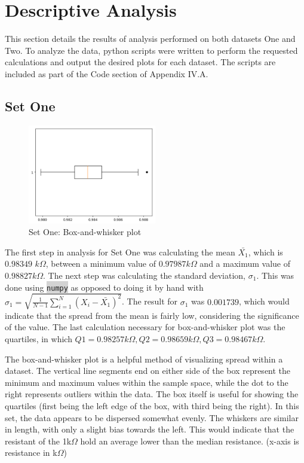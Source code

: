 \documentclass[10pt]{report}
\newcommand{\inlinecode}[2]{\colorbox{lightgray}{\lstinline[language=#1]$#2$}}
\begin{document}
\newpage

\section*{Descriptive Analysis}

This section details the results of analysis performed on both datasets One and Two.
To analyze the data, python scripts were written to perform the requested calculations and output the desired
plots for each dataset. The scripts are included as part of the Code section of Appendix IV.A.

\subsection*{Set One}

\begin{figure}
    \centering
    \includegraphics[width=0.50\textwidth]{results/resistor_boxplot}
    \caption{Set One: Box-and-whisker plot}
\end{figure}

The first step in analysis for Set One was calculating the mean $\bar{X_1}$, which is  $0.98349$ $k\Omega$,
between a minimum value of $0.97987 k\Omega$ and a maximum value of $0.98827 k\Omega$. The next step was calculating
the standard deviation, $\sigma_1$. This was done using \inlinecode{Python}{numpy} as opposed
to doing it by hand with $\sigma_1 = \sqrt{\frac{1}{N-1} \sum_{i=1}^N (X_i - \bar{X_1})^2}$.
The result for $\sigma_1$ was $0.001739$, which would indicate that the spread from the mean is fairly low,
considering the significance of the value.
The last calculation necessary for box-and-whisker plot was the quartiles,
in which $Q1 = 0.98257 k\Omega, Q2 = 0.98659 k\Omega, Q3 = 0.98467 k\Omega$.


The box-and-whisker plot is a helpful method of visualizing spread within a dataset.
The vertical line segments end on either side of the box represent the minimum and maximum
values within the sample space, while the dot to the right represents outliers within the data.
The box itself is useful for showing the quartiles (first being the left edge of the box, with
third being the right).
In this set, the data appears to be dispersed somewhat evenly. The whiskers are similar in length,
with only a slight bias towards the left. This would indicate that the resistant of the 1k$\Omega$
hold an average lower than the median resistance. (x-axis is resistance in k$\Omega$)
\end{document}
